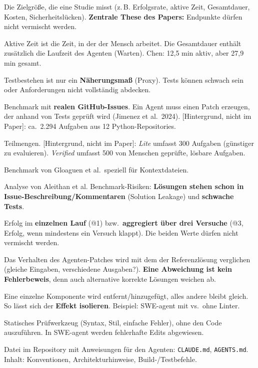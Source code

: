 \documentclass[12pt,a4paper]{article}
\newcommand{\hg}{\textcolor{grau}{\small[Hintergrund, nicht im Paper]}}
\newcommand{\quelle}[1]{\textcolor{grau}{(#1)}}
\begin{document}
\begin{description}[style=nextline,leftmargin=1.2em,itemsep=0.45em]
  \item[Endpunkt] Die Zielgröße, die eine Studie misst (z.\,B. Erfolgsrate, aktive Zeit, Gesamtdauer, Kosten, Sicherheitslücken). \textbf{Zentrale These des Papers:} Endpunkte dürfen nicht vermischt werden.
  \item[Aktive Arbeitszeit vs.\ Gesamtdauer] Aktive Zeit ist die Zeit, in der der Mensch arbeitet. Die Gesamtdauer enthält zusätzlich die Laufzeit des Agenten (Warten). Chen: 12,5 min aktiv, aber 27,9 min gesamt.
  \item[Funktionale Korrektheit vs.\ Testbestehen] Testbestehen ist nur ein \textbf{Näherungsmaß} (Proxy). Tests können schwach sein oder Anforderungen nicht vollständig abdecken.
  \item[SWE-bench] Benchmark mit \textbf{realen GitHub-Issues}. Ein Agent muss einen Patch erzeugen, der anhand von Tests geprüft wird \quelle{Jimenez et al.\ 2024}. \hg: ca.\ 2.294 Aufgaben aus 12 Python-Repositories.
  \item[SWE-bench Lite / Verified] Teilmengen. \hg: \emph{Lite} umfasst 300 Aufgaben (günstiger zu evaluieren). \emph{Verified} umfasst 500 von Menschen geprüfte, lösbare Aufgaben.
  \item[CTXBench] Benchmark von Gloaguen et al.\ speziell für Kontextdateien.
  \item[SWE-Bench+] Analyse von Aleithan et al. Benchmark-Risiken: \textbf{Lösungen stehen schon in Issue-Beschreibung/Kommentaren} (Solution Leakage) und \textbf{schwache Tests}.
  \item[@1 / @3] Erfolg im \textbf{einzelnen Lauf} (@1) bzw.\ \textbf{aggregiert über drei Versuche} (@3, Erfolg, wenn mindestens ein Versuch klappt). Die beiden Werte dürfen nicht vermischt werden.
  \item[Differenzielles Testen] Das Verhalten des Agenten-Patches wird mit dem der Referenzlösung verglichen (gleiche Eingaben, verschiedene Ausgaben?). \textbf{Eine Abweichung ist kein Fehlerbeweis}, denn auch alternative korrekte Lösungen weichen ab.
  \item[Ablation] Eine einzelne Komponente wird entfernt/hinzugefügt, alles andere bleibt gleich. So lässt sich der \textbf{Effekt isolieren}. Beispiel: SWE-agent mit vs.\ ohne Linter.
  \item[Linter] Statisches Prüfwerkzeug (Syntax, Stil, einfache Fehler), ohne den Code auszuführen. In SWE-agent werden fehlerhafte Edits abgewiesen.
  \item[Kontextdatei] Datei im Repository mit Anweisungen für den Agenten: \texttt{CLAUDE.md}, \texttt{AGENTS.md}. Inhalt: Konventionen, Architekturhinweise, Build-/Testbefehle.

\end{description}
\end{document}
